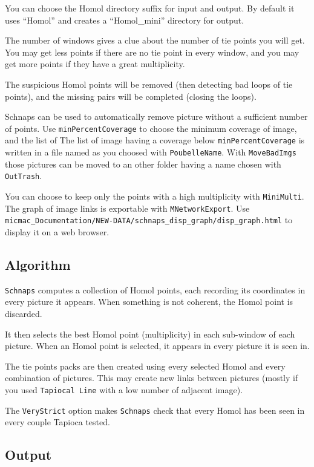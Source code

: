 You can choose the Homol directory suffix for input and output. By default it uses ``Homol'' and creates a ``Homol\_mini'' directory for output.

The number of windows gives a clue about the number of tie points you will get.
You may get less points if there are no tie point in every window, and you may get more points if they have a great multiplicity.

The suspicious Homol points will be removed (then detecting bad loops of tie points), and the missing pairs will be completed (closing the loops).

Schnaps can be used to automatically remove picture without a sufficient number of points.
Use {\tt minPercentCoverage} to choose the minimum coverage of image, and the list of 
The list of image having a coverage below {\tt minPercentCoverage} is written in a file named as you choosed with {\tt PoubelleName}.
With {\tt MoveBadImgs} those pictures can be moved to an other folder having a name chosen with {\tt OutTrash}.

You can choose to keep only the points with a high multiplicity with {\tt MiniMulti}.
The graph of image links is exportable with {\tt MNetworkExport}. Use {\tt micmac\_Documentation/NEW-DATA/schnaps\_disp\_graph/disp\_graph.html} to display it on
a web browser.

\subsection{Algorithm}
{\tt Schnaps} computes a collection of Homol points, each recording its coordinates in every picture it appears.
When something is not coherent, the Homol point is discarded.

It then selects the best Homol point (multiplicity) in each sub-window of each picture.
When an Homol point is selected, it appears in every picture it is seen in.

The tie points packs are then created using every selected Homol and every combination of pictures.
This may create new links between pictures (mostly if you used {\tt Tapiocal Line} with a low number of adjacent image).

The {\tt VeryStrict} option makes {\tt Schnaps} check that every Homol has been seen in every couple Tapioca tested.


\subsection{Output}

